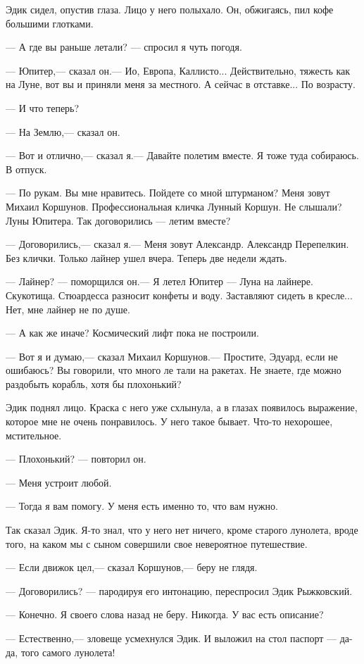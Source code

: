 \documentclass[11pt,a4paper,oneside]{article}
\begin{document}
Эдик сидел, опустив глаза. Лицо у него полыхало. Он, обжигаясь, пил кофе большими глотками.

— А где вы раньше летали? — спросил я чуть погодя.

— Юпитер,— сказал он.— Ио, Европа, Каллисто... Действительно, тяжесть как на Луне, вот вы и приняли меня за местного. А сейчас в отставке... По возрасту.

— И что теперь?

— На Землю,— сказал он.

— Вот и отлично,— сказал я.— Давайте полетим вместе. Я тоже туда собираюсь. В отпуск.

— По рукам. Вы мне нравитесь. Пойдете со мной штурманом? Меня зовут Михаил Коршунов. Профессиональная кличка Лунный Коршун. Не слышали? Луны Юпитера. Так договорились — летим вместе?

— Договорились,— сказал я.— Меня зовут Александр. Александр Перепелкин. Без клички. Только лайнер ушел вчера. Теперь две недели ждать.

— Лайнер? — поморщился он.— Я летел Юпитер — Луна на лайнере. Скукотища. Стюардесса разносит конфеты и воду. Заставляют сидеть в кресле... Нет, мне лайнер не по душе.

— А как же иначе? Космический лифт пока не построили.

— Вот я и думаю,— сказал Михаил Коршунов.— Простите, Эдуард, если не ошибаюсь? Вы говорили, что много ле тали на ракетах. Не знаете, где можно раздобыть корабль, хотя бы плохонький?

Эдик поднял лицо. Краска с него уже схлынула, а в глазах появилось выражение, которое мне не очень понравилось. У него такое бывает. Что-то нехорошее, мстительное.

— Плохонький? — повторил он.

— Меня устроит любой.

— Тогда я вам помогу. У меня есть именно то, что вам нужно.

Так сказал Эдик. Я-то знал, что у него нет ничего, кроме старого лунолета, вроде того, на каком мы с сыном совершили свое невероятное путешествие.

— Если движок цел,— сказал Коршунов,— беру не глядя.

— Договорились? — пародируя его интонацию, переспросил Эдик Рыжковский.

— Конечно. Я своего слова назад не беру. Никогда. У вас есть описание?

— Естественно,— зловеще усмехнулся Эдик. И выложил на стол паспорт — да-да, того самого лунолета!
\end{document}
